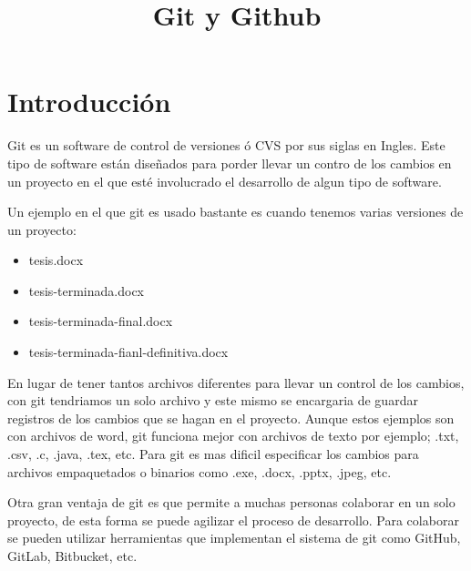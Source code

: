 \documentclass[11pt, oneside]{article}
\title{Git y Github}
\begin{document}
\maketitle

\section{Introducción}
Git es un software de control de versiones ó CVS por sus siglas en Ingles. Este tipo de software están diseñados para porder llevar un contro de los cambios en un proyecto en el que esté involucrado el desarrollo de algun tipo de software.

Un ejemplo en el que git es usado bastante es cuando tenemos varias versiones de un proyecto:
\begin{itemize}
  \item tesis.docx
  \item tesis-terminada.docx
  \item tesis-terminada-final.docx
  \item tesis-terminada-fianl-definitiva.docx
\end{itemize}
En lugar de tener tantos archivos diferentes para llevar un control de los cambios, con git tendriamos un solo archivo y este mismo se encargaria de guardar registros de los cambios que se hagan en el proyecto. Aunque estos ejemplos son con archivos de word, git funciona mejor con archivos de texto por ejemplo; .txt, .csv, .c, .java, .tex, etc. Para git es mas dificil especificar los cambios para archivos empaquetados o binarios como .exe, .docx, .pptx, .jpeg, etc.

Otra gran ventaja de git es que permite a muchas personas colaborar en un solo proyecto, de esta forma se puede agilizar el proceso de desarrollo. Para colaborar se pueden utilizar herramientas que implementan el sistema de git como GitHub, GitLab, Bitbucket, etc.
\end{document}
